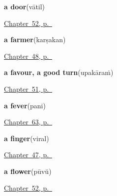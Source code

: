\noindent\begin{minipage}[t]{\linewidth}
\raggedright
\textbf{a door}\enspace\emph{}\enspace(vātil)\par
\footnotesize \hyperref[ch:ml-welcoming-a-guest]{Chapter~52, p.~\pageref*{ch:ml-welcoming-a-guest}}
\end{minipage}\par\smallskip

\noindent\begin{minipage}[t]{\linewidth}
\raggedright
\textbf{a farmer}\enspace\emph{}\enspace(karṣakan)\par
\footnotesize \hyperref[ch:ml-roles]{Chapter~48, p.~\pageref*{ch:ml-roles}}
\end{minipage}\par\smallskip

\noindent\begin{minipage}[t]{\linewidth}
\raggedright
\textbf{a favour, a good turn}\enspace\emph{}\enspace(upakāraṁ)\par
\footnotesize \hyperref[ch:ml-courtesy]{Chapter~51, p.~\pageref*{ch:ml-courtesy}}
\end{minipage}\par\smallskip

\noindent\begin{minipage}[t]{\linewidth}
\raggedright
\textbf{a fever}\enspace\emph{}\enspace(pani)\par
\footnotesize \hyperref[ch:ml-how-the-body-reports]{Chapter~63, p.~\pageref*{ch:ml-how-the-body-reports}}
\end{minipage}\par\smallskip

\noindent\begin{minipage}[t]{\linewidth}
\raggedright
\textbf{a finger}\enspace\emph{}\enspace(viral)\par
\footnotesize \hyperref[ch:ml-body-more]{Chapter~47, p.~\pageref*{ch:ml-body-more}}
\end{minipage}\par\smallskip

\noindent\begin{minipage}[t]{\linewidth}
\raggedright
\textbf{a flower}\enspace\emph{}\enspace(pūvŭ)\par
\footnotesize \hyperref[ch:ml-welcoming-a-guest]{Chapter~52, p.~\pageref*{ch:ml-welcoming-a-guest}}
\end{minipage}\par\smallskip

